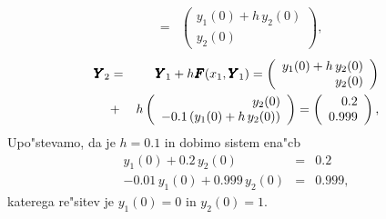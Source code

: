 \documentclass[12pt,a4paper]{article}
\def\bfm#1{{\dimen0=.01em\dimen1=.009em\makebold{$#1$}}}
\def\makebold#1{\mathord{\setbox0=\hbox{#1}
       \copy0\kern-\wd0
       \raise\dimen1\copy0\kern-\wd0
       {\advance\dimen1 by \dimen1\raise\dimen1\copy0}\kern-\wd0
       \kern\dimen0\raise\dimen1\copy0\kern-\wd0
       {\advance\dimen1 by \dimen1\raise\dimen1\copy0}\kern-\wd0
       \kern\dimen0\raise\dimen1\copy0\kern-\wd0
       {\advance\dimen1 by \dimen1\raise\dimen1\copy0}\kern-\wd0
       \kern\dimen0\raise\dimen1\copy0\kern-\wd0
       \kern\dimen0\box0}}
\begin{document}
\begin{enumerate}
\begin{eqnarray*}
    &=&
    \left(
    \begin{array}{r}
      y_1(0)+h\,y_2(0)\\
      y_2(0)
    \end{array}\right),
    \end{eqnarray*}
    \begin{eqnarray*}
      \bfm{Y}_2&=&\bfm{Y}_1+h\bfm{F}(x_1,\bfm{Y}_1)=
    \left(
    \begin{array}{r}
      y_1(0)+h\,y_2(0)\\
      y_2(0)
    \end{array}\right)\\
    &+&h
    \left(
    \begin{array}{r}
      y_2(0)\\
      -0.1\,(y_1(0)+h\,y_2(0))
    \end{array}\right)
    =
    \left(
    \begin{array}{r}
      0.2\\
      0.999
    \end{array}\right),
    \end{eqnarray*}
Upo"stevamo, da je $h=0.1$ in dobimo sistem ena"cb
\begin{eqnarray*}
   y_1(0)+0.2\,y_2(0)&=&0.2\\
   -0.01\,y_1(0)+0.999\,y_2(0)&=&0.999,
\end{eqnarray*}
katerega re"sitev je $y_1(0)=0$ in $y_2(0)=1$.
\end{enumerate}
\end{document}
